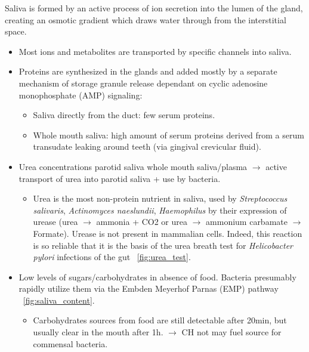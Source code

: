 \begin{tcolorbox}[breakable,
    title=Saliva,
    title filled=false,
    colback=blue!5!white,
    colframe=blue!75!black]
    Saliva is formed by an active process of ion secretion into the lumen of the gland, creating an osmotic gradient which 
    draws water through from the interstitial space. 
    \begin{itemize}
        \item Most ions and metabolites are transported by specific channels into saliva. 
        \item Proteins are synthesized in the glands and added mostly by a separate mechanism of storage granule release
        dependant on cyclic adenosine monophosphate (AMP) signaling:
        \begin{itemize}
            \item Saliva directly from the duct: few serum proteins.
            \item Whole mouth saliva: high amount of serum proteins derived from a serum transudate leaking around teeth 
            (via gingival crevicular fluid).
        \end{itemize}
        \item Urea concentrations  parotid saliva \> whole mouth saliva/plasma $\rightarrow$ active transport of urea into parotid 
        saliva + use by bacteria.
        \begin{itemize}
            \item Urea is the most non-protein nutrient in saliva, used by \textit{Streptococcus salivaris}, 
            \textit{Actinomyces naeslundii}, \textit{Haemophilus} by their expression of urease 
            (urea $\rightarrow$ ammonia + CO2 or urea $\rightarrow$ ammonium carbamate $\rightarrow$ Formate). Urease is not present in mammalian cells. 
            Indeed, this reaction is so reliable that it is the basis of the urea breath test for \textit{Helicobacter pylori} 
            infections of the gut ~\autoref{fig:urea_test}.
        \end{itemize}
        \item Low levels of sugars/carbohydrates in absence of food. Bacteria presumably rapidly utilize them via the 
        Embden Meyerhof Parnas (EMP) pathway ~\autoref{fig:saliva_content}.
        \begin{itemize}
            \item Carbohydrates sources from food are still detectable after 20min, but usually clear in the mouth after 
            1h. $\rightarrow$ CH not may fuel source for commensal bacteria. 

\end{itemize}
\end{itemize}
\end{tcolorbox}
